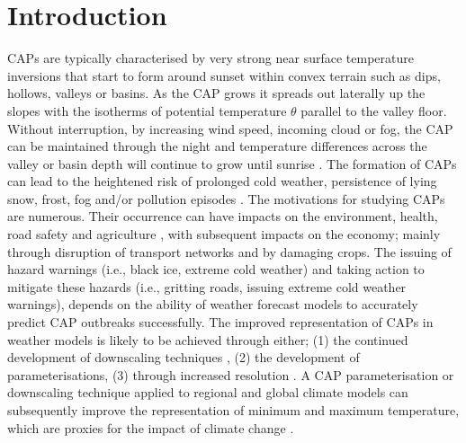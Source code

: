 \documentclass[times]{qjrms4}
\begin{document}

\maketitle

\section{Introduction}
CAPs are typically characterised by very strong near surface temperature inversions that start to form around sunset within convex terrain such as dips, hollows, valleys or basins. As the CAP grows it spreads out laterally up the slopes with the isotherms of potential temperature $\theta$ parallel to the valley floor. Without interruption, by increasing wind speed, incoming cloud or fog, the CAP can be maintained through the night and temperature differences across the valley or basin depth will continue to grow until sunrise \citep{gustavssonetal1998}. The formation of CAPs can lead to the heightened risk of prolonged cold weather, persistence of lying snow, frost, fog and/or pollution episodes \citep{lareauetal2013persist}. The motivations for studying CAPs are numerous. Their occurrence can have impacts on the environment, health, road safety \citep{bogren2000local} and agriculture \citep{lindkvistetal2000,madelin2005spatial}, with subsequent impacts on the economy; mainly through disruption of transport networks and by damaging crops. The issuing of hazard warnings (i.e., black ice, extreme cold weather) and taking action to mitigate these hazards (i.e., gritting roads, issuing extreme cold weather warnings), depends on the ability of weather forecast models to accurately predict CAP outbreaks successfully. The improved representation of CAPs in weather models is likely to be achieved through either; (1) the continued development of downscaling techniques \citep{pozdnoukhov2009data,sheridan2013characteristics}, (2) the development of parameterisations, (3) through increased resolution \citep{vosper2013high,hughes2015assessment}. A CAP parameterisation or downscaling technique applied to regional and global climate models can subsequently improve the representation of minimum and maximum temperature, which are proxies for the impact of climate change \citep{daly2010local}.
	
\end{document}
